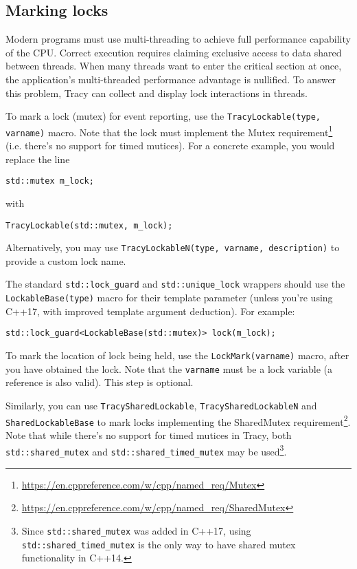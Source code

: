 \documentclass[hidelinks,titlepage,a4paper]{article}
\begin{document}
\subsection{Marking locks}

Modern programs must use multi-threading to achieve full performance capability of the CPU. Correct execution requires claiming exclusive access to data shared between threads. When many threads want to enter the critical section at once, the application's multi-threaded performance advantage is nullified. To answer this problem, Tracy can collect and display lock interactions in threads. 

To mark a lock (mutex) for event reporting, use the \texttt{TracyLockable(type, varname)} macro. Note that the lock must implement the Mutex requirement\footnote{\url{https://en.cppreference.com/w/cpp/named_req/Mutex}} (i.e. there's no support for timed mutices). For a concrete example, you would replace the line

\begin{lstlisting}
std::mutex m_lock;
\end{lstlisting}

with

\begin{lstlisting}
TracyLockable(std::mutex, m_lock);
\end{lstlisting}

Alternatively, you may use \texttt{TracyLockableN(type, varname, description)} to provide a custom lock name.

The standard \texttt{std::lock\_guard} and \texttt{std::unique\_lock} wrappers should use the \texttt{LockableBase(type)} macro for their template parameter (unless you're using C++17, with improved template argument deduction). For example:

\begin{lstlisting}
std::lock_guard<LockableBase(std::mutex)> lock(m_lock);
\end{lstlisting}

To mark the location of lock being held, use the \texttt{LockMark(varname)} macro, after you have obtained the lock. Note that the \texttt{varname} must be a lock variable (a reference is also valid). This step is optional.

Similarly, you can use \texttt{TracySharedLockable}, \texttt{TracySharedLockableN} and \texttt{SharedLockableBase} to mark locks implementing the SharedMutex requirement\footnote{\url{https://en.cppreference.com/w/cpp/named_req/SharedMutex}}. Note that while there's no support for timed mutices in Tracy, both \texttt{std::shared\_mutex} and \texttt{std::shared\_timed\_mutex} may be used\footnote{Since \texttt{std::shared\_mutex} was added in C++17, using \texttt{std::shared\_timed\_mutex} is the only way to have shared mutex functionality in C++14.}.
\end{document}
